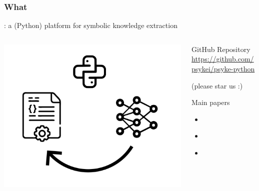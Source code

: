 \documentclass[presentation]{beamer}\mode<presentation>{\usetheme{AMSBolognaFC}}
\begin{document}
\begin{frame}%
    \frametitle{What}

    \alert{\psyke}: a (Python) platform for symbolic knowledge extraction

    \begin{columns}
        \begin{column}{.3\linewidth}
            \centering
            \includegraphics[width=\linewidth]{./figures/psyke-logo.pdf}
        \end{column}
        \begin{column}{.7\linewidth}
            \begin{block}{GitHub Repository}\centering
                \alert{\url{https://github.com/psykei/psyke-python}}

                \tiny{(please star us :)}
            \end{block}

            \begin{block}{Main papers}
                \begin{itemize}
                    \item \cite{psyke-woa2021}
                    \item \cite{swpsyke-extraamas2022}
                    \item \cite{psyke-ia16}
                \end{itemize}
            \end{block}
        \end{column}
    \end{columns}
\end{frame}
\end{document}
